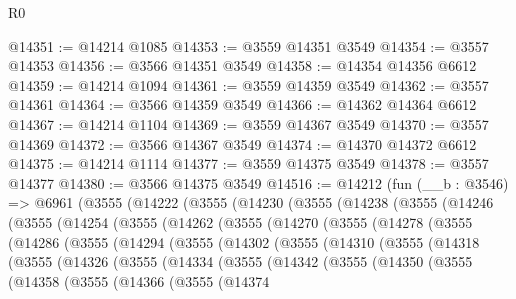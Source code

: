 \begin{lexlean}{R0}
\begin{coremodule}
@14351 := @14214 @1085
@14353 := @3559 @14351 @3549
@14354 := @3557 @14353
@14356 := @3566 @14351 @3549
@14358 := @14354 @14356 @6612
@14359 := @14214 @1094
@14361 := @3559 @14359 @3549
@14362 := @3557 @14361
@14364 := @3566 @14359 @3549
@14366 := @14362 @14364 @6612
@14367 := @14214 @1104
@14369 := @3559 @14367 @3549
@14370 := @3557 @14369
@14372 := @3566 @14367 @3549
@14374 := @14370 @14372 @6612
@14375 := @14214 @1114
@14377 := @3559 @14375 @3549
@14378 := @3557 @14377
@14380 := @3566 @14375 @3549
@14516 := @14212
    (fun (__b : @3546) =>
    @6961
      (@3555
        (@14222
          (@3555
            (@14230
              (@3555
                (@14238
                  (@3555
                    (@14246
                      (@3555
                        (@14254
                          (@3555
                            (@14262
                              (@3555
                                (@14270
                                  (@3555
                                    (@14278
                                      (@3555
                                        (@14286
                                          (@3555
                                            (@14294
                                              (@3555
                                                (@14302
                                                  (@3555
                                                    (@14310
                                                      (@3555
                                                        (@14318
                                                          (@3555
                                                            (@14326
                                                              (@3555
                                                                (@14334
                                                                  (@3555
                                                                    (@14342
                                                                      (@3555
                                                                        (@14350
                                                                          (@3555
                                                                            (@14358
                                                                              (@3555
                                                                                (@14366
                                                                                  (@3555
                                                                                    (@14374

\end{coremodule}
\end{lexlean}
